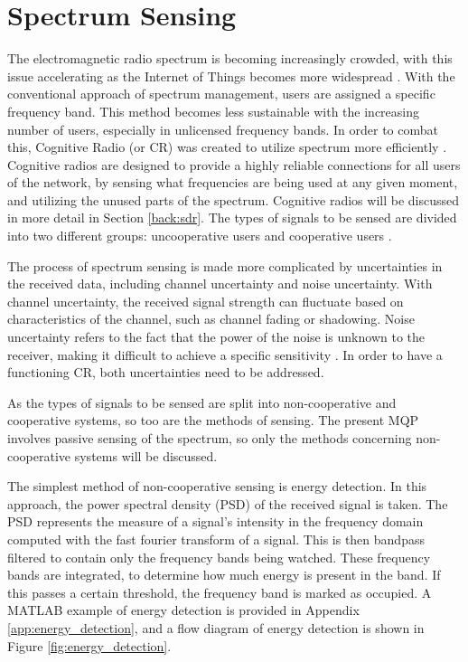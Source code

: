 \section{Spectrum Sensing} \label{Cyclostationary Feature Detection}
The electromagnetic radio spectrum is becoming increasingly crowded, with this issue accelerating as the Internet of Things becomes more widespread \cite{sensing_iot}. With the conventional approach of spectrum management, users are assigned a specific frequency band. This method becomes less sustainable with the increasing number of users, especially in unlicensed frequency bands. In order to combat this, Cognitive Radio (or CR) was created to utilize spectrum more efficiently \cite{wyglinski_book}. Cognitive radios are designed to provide a highly reliable connections for all users of the network, by sensing what frequencies are being used at any given moment, and utilizing the unused parts of the spectrum. Cognitive radios will be discussed in more detail in Section \ref{back:sdr}. The types of signals to be sensed are divided into two different groups: uncooperative users and cooperative users \cite{spectrum_sense_methods}. \par
The process of spectrum sensing is made more complicated by uncertainties in the received data, including channel uncertainty and noise uncertainty. With channel uncertainty, the received signal strength can fluctuate based on characteristics of the channel, such as channel fading or shadowing. Noise uncertainty refers to the fact that the power of the noise is unknown to the receiver, making it difficult to achieve a specific sensitivity \cite{spectrum_sense_methods}. In order to have a functioning CR, both uncertainties need to be addressed. \par
As the types of signals to be sensed are split into non-cooperative and cooperative systems, so too are the methods of sensing. The present MQP involves passive sensing of the spectrum, so only the methods concerning non-cooperative systems will be discussed.\par
The simplest method of non-cooperative sensing is energy detection. In this approach, the power spectral density (PSD) of the received signal is taken\cite{sensing_energy}. The PSD represents the measure of a signal’s intensity in the frequency domain computed with the fast fourier transform of a signal. This is then bandpass filtered to contain only the frequency bands being watched. These frequency bands are integrated, to determine how much energy is present in the band. If this passes a certain threshold, the frequency band is marked as occupied. A MATLAB example of energy detection is provided in Appendix \ref{app:energy_detection}, and a flow diagram of energy detection is shown in Figure \ref{fig:energy_detection}.
